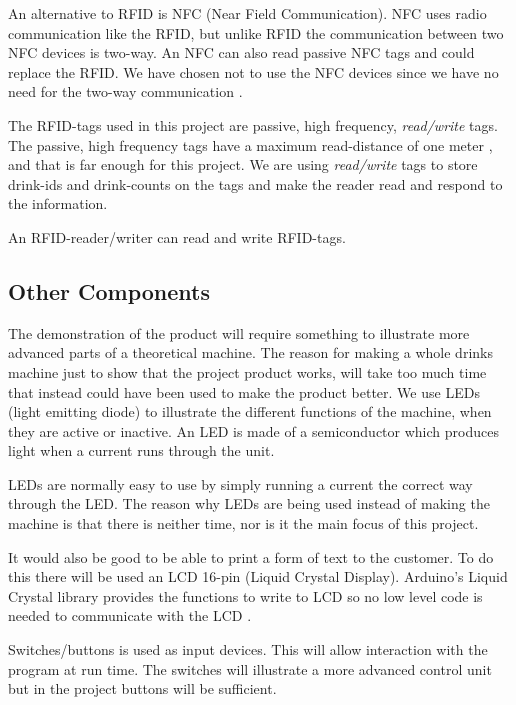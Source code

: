 An alternative to RFID is NFC (Near Field Communication). NFC uses radio communication like the RFID, but unlike RFID the communication between two NFC devices is two-way. An NFC can also read passive NFC tags and could replace the RFID. We have chosen not to use the NFC devices since we have no need for the two-way communication \citep{NFC}.

The RFID-tags used in this project are passive, high frequency, \textit{read/write} tags. The passive, high frequency tags have a maximum read-distance of one meter \citep{RFID}, and that is far enough for this project. We are using \textit{read/write} tags to store drink-ids and drink-counts on the tags and make the reader read and respond to the information.

An RFID-reader/writer can read and write RFID-tags. 

\subsection{Other Components}
The demonstration of the product will require something to illustrate more advanced parts of a theoretical machine.
The reason for making a whole drinks machine just to show that the project product works, will take too much time that instead could have been used to make the product better. 
We use LEDs (light emitting diode) to illustrate the different functions of the machine, when they are active or inactive. An LED is made of a semiconductor which produces light when a current runs through the unit.

LEDs are normally easy to use by simply running a current the correct way through the LED.
The reason why LEDs are being used instead of making the machine is that there is neither time, nor is it the main focus of this project.

It would also be good to be able to print a form of text to the customer. To do this there will be used an LCD 16-pin (Liquid Crystal Display). Arduino's Liquid Crystal library provides the functions to write to LCD so no low level code is needed to communicate with the LCD \citep{ArduinoLCD}.

Switches/buttons is used as input devices. This will allow interaction with the program at run time. The switches will illustrate a more advanced control unit but in the project buttons will be sufficient.